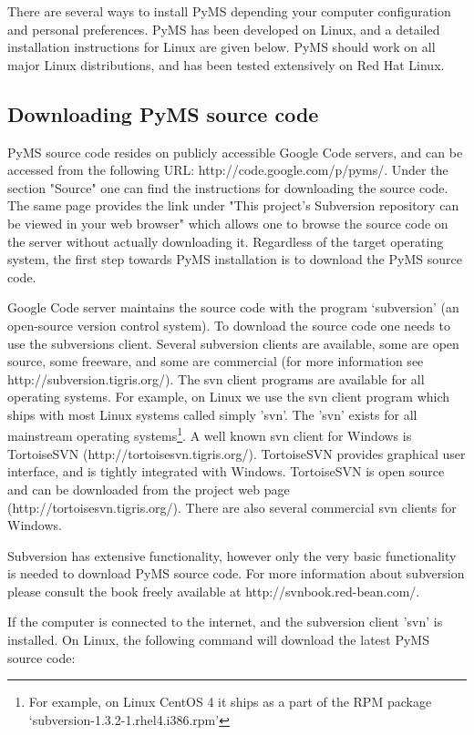 There are several ways to install PyMS depending your computer
configuration and personal preferences. PyMS has been developed
on Linux, and a detailed installation instructions for Linux are
given below. PyMS should work on all major Linux distributions,
and has been tested extensively on Red Hat Linux.

\subsection{\label{subsec:code-download}Downloading PyMS source code}

PyMS source code resides on publicly accessible Google Code servers,
and can be accessed from the following URL: http://code.google.com/p/pyms/.
Under the section "Source" one can find the instructions for downloading
the source code. The same page provides the link under "This project's
Subversion repository can be viewed in your web browser" which allows
one to browse the source code on the server without actually downloading
it. Regardless of the target operating system, the first step towards
PyMS installation is to download the PyMS source code.

Google Code server maintains the source code with the program `subversion'
(an open-source version control system). To download the source code
one needs to use the subversions client. Several subversion clients are
available, some are open source, some freeware, and some are commercial
(for more information see http://subversion.tigris.org/). The svn client
programs are available for all operating systems. For example, on Linux
we use the svn client program which ships with most Linux systems called
simply 'svn'. The 'svn' exists for all mainstream operating
systems\footnote{For example, on Linux CentOS 4 it ships as a part of
the RPM package `subversion-1.3.2-1.rhel4.i386.rpm'}. A well known 
svn client for Windows is TortoiseSVN (http://tortoisesvn.tigris.org/).
TortoiseSVN provides graphical user interface, and is tightly integrated
with Windows. TortoiseSVN is open source and can be downloaded from the
project web page (http://tortoisesvn.tigris.org/). There are also several
commercial svn clients for Windows.

Subversion has extensive functionality, however only the very basic
functionality is needed to download PyMS source code. For more information
about subversion please consult the book freely available
at http://svnbook.red-bean.com/.

If the computer is connected to the internet, and the subversion client
'svn' is installed. On Linux, the following command will download the
latest PyMS source code:

